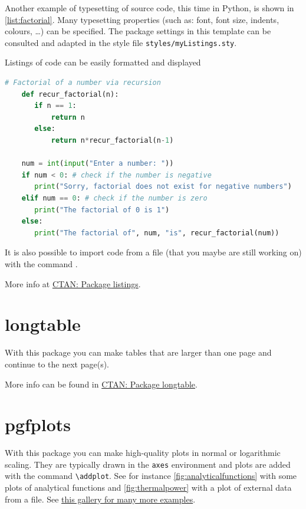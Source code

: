 Another example of typesetting of source code, this time in Python, is shown in \cref{list:factorial}. Many typesetting properties (such as: font, font size, indents, colours, \dots) can be specified. The package settings in this template can be consulted and adapted in the style file \texttt{styles/myListings.sty}.

\begin{frame}[fragile]{Listings of code can be easily formatted and displayed}
    \begin{lstlisting}[language=Python, caption={Python code to calculate factorial, adapted from \href{https://www.programiz.com/python-programming/examples/factorial-recursion}{programiz}},label={list:factorial}]
    # Factorial of a number via recursion
    def recur_factorial(n):
       if n == 1:
           return n
       else:
           return n*recur_factorial(n-1)
    
    num = int(input("Enter a number: "))
    if num < 0: # check if the number is negative
       print("Sorry, factorial does not exist for negative numbers")
    elif num == 0: # check if the number is zero
       print("The factorial of 0 is 1")
    else:
       print("The factorial of", num, "is", recur_factorial(num))
    \end{lstlisting}
\end{frame}

It is also possible to import code from a file (that you maybe are still working on) with the command \verb||.

More info at \href{https://ctan.org/pkg/listings?lang=en}{CTAN: Package listings}.

\section{longtable}
With this package you can make tables that are larger than one page and continue to the next page(s).

More info can be found in \href{https://ctan.org/pkg/longtable?lang=en}{CTAN: Package longtable}.

\section{pgfplots}
With this package you can make high-quality plots in normal or logarithmic scaling. They are typically drawn in the \verb|axes| environment and plots are added with the command \verb|\addplot|. See for instance \cref{fig:analyticalfunctions} with some plots of analytical functions and \cref{fig:thermalpower} with a plot of external data from a file. See \href{http://pgfplots.sourceforge.net/gallery.html}{this gallery for many more examples}.

